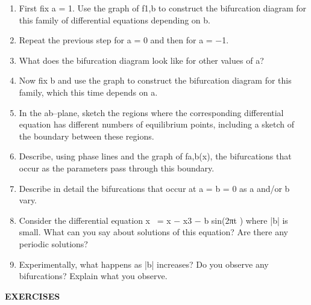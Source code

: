 \documentclass{article}
\begin{document}
\begin{enumerate}
\item First fix a = 1. Use the graph of f1,b to construct the bifurcation diagram
for this family of differential equations depending on b.
\item Repeat the previous step for a = 0 and then for a = −1.
\item What does the bifurcation diagram look like for other values of a?
\item Now fix b and use the graph to construct the bifurcation diagram for this
family, which this time depends on a.
\item In the ab–plane, sketch the regions where the corresponding differential
equation has different numbers of equilibrium points, including a sketch
of the boundary between these regions.
\item Describe, using phase lines and the graph of fa,b(x), the bifurcations that
occur as the parameters pass through this boundary.
\item Describe in detail the bifurcations that occur at a = b = 0 as a and/or b
vary.

\item Consider the differential equation x  = x − x3 − b sin(2πt ) where |b| is
small. What can you say about solutions of this equation? Are there any
periodic solutions?
\item Experimentally, what happens as |b| increases? Do you observe any
bifurcations? Explain what you observe.
\end{enumerate}

\hfill

\textbf{EXERCISES}

\hfill
\end{document}
